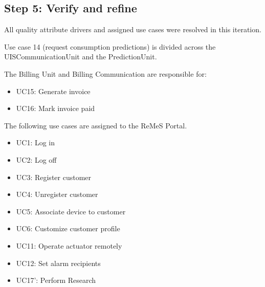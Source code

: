 \subsection{Step 5: Verify and refine}
\label{add:it10/verification}

\npar All quality attribute drivers and assigned use cases were resolved in
this iteration. 

\npar Use case 14 (request consumption predictions) is divided across the
UISCommunicationUnit and the PredictionUnit.

\npar The Billing Unit and Billing Communication are responsible for:

\begin{itemize}
    \item UC15: Generate invoice
    \item UC16: Mark invoice paid
\end{itemize}

\npar The following use cases are assigned to the ReMeS Portal.

\begin{itemize}
	\item UC1: Log in
	\item UC2: Log off
	\item UC3: Register customer
	\item UC4: Unregister customer
	\item UC5: Associate device to customer
	\item UC6: Customize customer profile
	\item UC11: Operate actuator remotely
	\item UC12: Set alarm recipients
	\item UC17': Perform Research
\end{itemize}
